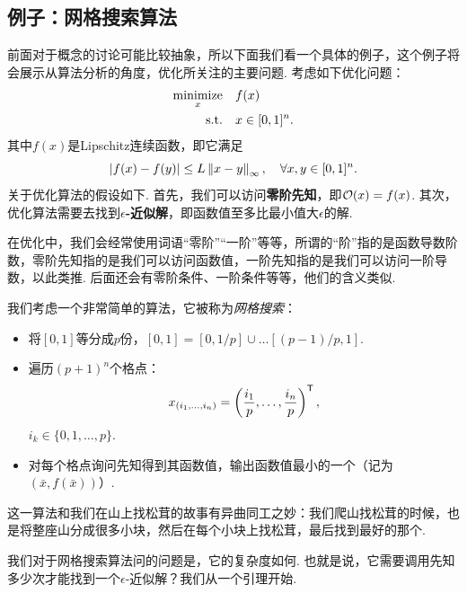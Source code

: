 \subsection{例子：网格搜索算法}

前面对于概念的讨论可能比较抽象，所以下面我们看一个具体的例子，这个例子将会展示从算法分析的角度，优化所关注的主要问题. 考虑如下优化问题：
\begin{equation}
    \begin{aligned}
    \operatorname*{minimize}_{x}&\quad f(x)\\
    \text{s.t.}&\quad x\in[0,1]^n.
\end{aligned}\label{opt:grid-search}
\end{equation}
其中$f(x)$是Lipschitz连续函数，即它满足
    \[|f(x)-f(y)|\leq L\left\|x-y\right\|_\infty,\quad\forall x,y\in[0,1]^n.\]
关于优化算法的假设如下. 首先，我们可以访问\textbf{零阶先知}，即$\mathcal{O}(x)=f(x)$. 其次，优化算法需要去找到\textbf{$\epsilon$-近似解}，即函数值至多比最小值大$\epsilon$的解.

\begin{remark}

        在优化中，我们会经常使用词语“零阶”“一阶”等等，所谓的“阶”指的是函数导数阶数，零阶先知指的是我们可以访问函数值，一阶先知指的是我们可以访问一阶导数，以此类推. 后面还会有零阶条件、一阶条件等等，他们的含义类似. 
\end{remark}

我们考虑一个非常简单的算法，它被称为\textit{网格搜索}：
\begin{itemize}
    \item 将$[0,1]$等分成$p$份，$[0,1]=[0,1/p]\cup\dots[(p-1)/p,1]$.
    \item 遍历$(p+1)^n$个格点：
    \[x_{(i_1,\dots,i_n)}=\left(\frac{i_1}{p},\dots,\frac{i_n}{p}\right)^{\mathsf{T}},\]
    $i_k\in\{0,1,\dots,p\}$.
    \item 对每个格点询问先知得到其函数值，输出函数值最小的一个（记为$(\bar{x},f(\bar x))$）.
\end{itemize}

这一算法和我们在山上找松茸的故事有异曲同工之妙：我们爬山找松茸的时候，也是将整座山分成很多小块，然后在每个小块上找松茸，最后找到最好的那个.

我们对于网格搜索算法问的问题是，它的复杂度如何. 也就是说，它需要调用先知多少次才能找到一个$\epsilon$-近似解？我们从一个引理开始. 

